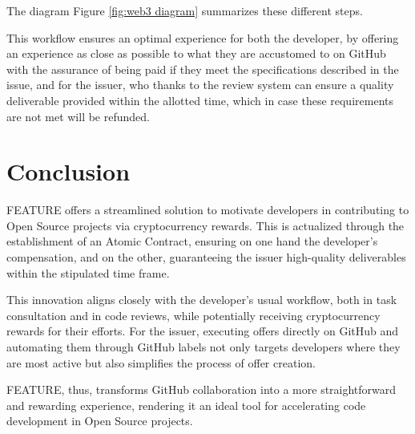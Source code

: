 \documentclass[
	a4paper, %
	10pt, %
	unnumberedsections, %
	twoside, %
]{LTJournalArticle}
\begin{document}
The diagram Figure \ref{fig:web3 diagram} summarizes these different steps.

This workflow ensures an optimal experience for both the developer, by offering an experience as close as possible to what they are accustomed to on GitHub with the assurance of being paid if they meet the specifications described in the issue, and for the issuer, who thanks to the review system can ensure a quality deliverable provided within the allotted time, which in case these requirements are not met will be refunded.

\section{Conclusion}

FEATURE offers a streamlined solution to motivate developers in contributing to Open Source projects via cryptocurrency rewards. This is actualized through the establishment of an Atomic Contract, ensuring on one hand the developer's compensation, and on the other, guaranteeing the issuer high-quality deliverables within the stipulated time frame.

This innovation aligns closely with the developer's usual workflow, both in task consultation and in code reviews, while potentially receiving cryptocurrency rewards for their efforts. For the issuer, executing offers directly on GitHub and automating them through GitHub labels not only targets developers where they are most active but also simplifies the process of offer creation.

FEATURE, thus, transforms GitHub collaboration into a more straightforward and rewarding experience, rendering it an ideal tool for accelerating code development in Open Source projects.
\end{document}
